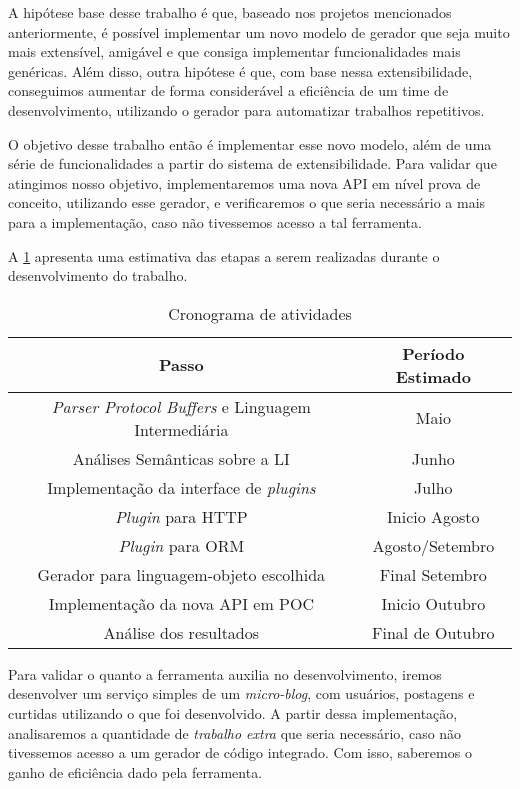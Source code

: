 A hipótese base desse trabalho é que, baseado nos projetos mencionados anteriormente,
é possível implementar um novo modelo de gerador que seja muito mais extensível, amigável
e que consiga implementar funcionalidades mais genéricas. Além disso, outra hipótese
é que, com base nessa extensibilidade, conseguimos aumentar de forma considerável a
eficiência de um time de desenvolvimento, utilizando o gerador para automatizar
trabalhos repetitivos.

O objetivo desse trabalho então é implementar esse novo modelo, além de uma série de
funcionalidades a partir do sistema de extensibilidade. Para validar que atingimos nosso
objetivo, implementaremos uma nova API em nível prova de conceito, utilizando esse gerador,
e verificaremos o que seria necessário a mais para a implementação, caso não tivessemos
acesso a tal ferramenta.

A \cref{tbl:cronograma} apresenta uma estimativa das etapas a serem realizadas durante
o desenvolvimento do trabalho.

\begin{table}[ht]
\centering
\begin{tabular}{c | c}
Passo & Período Estimado \\
\hline
\textit{Parser Protocol Buffers} e Linguagem Intermediária & Maio \\
Análises Semânticas sobre a LI & Junho \\
Implementação da interface de \textit{plugins} & Julho \\
\textit{Plugin} para HTTP & Inicio Agosto \\
\textit{Plugin} para ORM & Agosto/Setembro \\
Gerador para linguagem-objeto escolhida & Final Setembro \\
Implementação da nova API em POC & Inicio Outubro \\
Análise dos resultados & Final de Outubro
\end{tabular}
\caption{Cronograma de atividades}
\label{tbl:cronograma}
\end{table}


Para validar o quanto a ferramenta auxilia no desenvolvimento, iremos desenvolver um
serviço simples de um \textit{micro-blog}, com usuários, postagens e curtidas utilizando
o que foi desenvolvido. A partir dessa implementação, analisaremos a quantidade de
\textit{trabalho extra} que seria necessário, caso não tivessemos acesso a um gerador
de código integrado. Com isso, saberemos o ganho de eficiência dado pela ferramenta.

